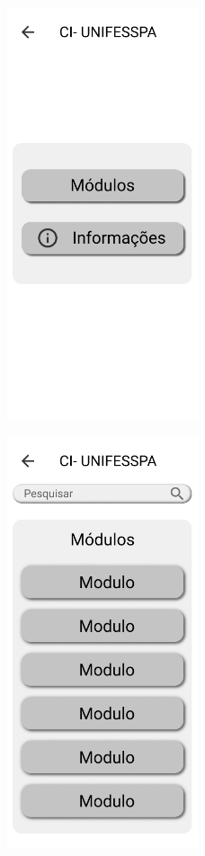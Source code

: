 \begin{apendicesenv}
\begin{figure}[H]
    \centering
    \includegraphics[width=0.5\textwidth]{figuras/Apêndice A/Presentation.png}
\end{figure}

\begin{figure}[H]
    \centering
    \includegraphics[width=0.5\textwidth]{figuras/Apêndice A/Module.png}
\end{figure}


\end{apendicesenv}
